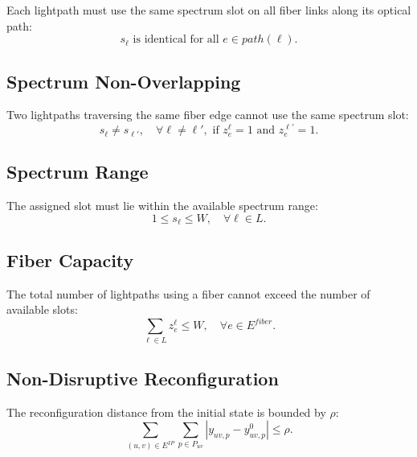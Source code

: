 \documentclass[journal,10pt]{IEEEtran}
\begin{document}
Each lightpath must use the same spectrum slot on all fiber links along its optical path:
\begin{equation}
    s_{\ell} \text{ is identical for all } e\in path(\ell).
    \label{eq:continuity}
\end{equation}

\subsection{Spectrum Non-Overlapping}

Two lightpaths traversing the same fiber edge cannot use the same spectrum slot:
\begin{equation}
    s_{\ell} \neq s_{\ell'},
    \quad
    \forall \ell\neq \ell',
    \text{ if } z^{\ell}_{e}=1 \text{ and } z^{\ell'}_{e}=1.
    \label{eq:non-overlap}
\end{equation}

\subsection{Spectrum Range}

The assigned slot must lie within the available spectrum range:
\begin{equation}
    1 \leq s_{\ell} \leq W,
    \quad \forall \ell\in L.
    \label{eq:slot-range}
\end{equation}

\subsection{Fiber Capacity}

The total number of lightpaths using a fiber cannot exceed the number of available slots:
\begin{equation}
    \sum_{\ell\in L} z^{\ell}_{e} \leq W,
    \quad \forall e\in E^{fiber}.
    \label{eq:fiber-capacity}
\end{equation}

\subsection{Non-Disruptive Reconfiguration}

The reconfiguration distance from the initial state is bounded by $\rho$:
\begin{equation}
    \sum_{(u,v)\in E^{IP}}
    \sum_{p\in P_{uv}}
    \left|y_{uv,p} - y^{0}_{uv,p}\right|
    \leq \rho.
    \label{eq:non-disruptive}
\end{equation}
\end{document}
